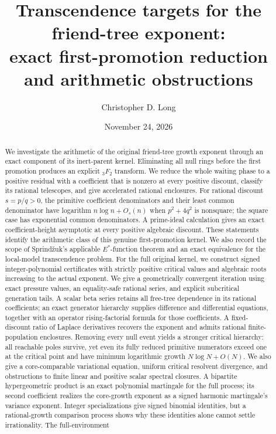 \documentclass[11pt]{article}
\title{Transcendence targets for the friend-tree exponent:\\
exact first-promotion reduction and arithmetic obstructions}
\author{Christopher D. Long}
\date{November 24, 2026}
\theoremstyle{remark}
\begin{document}
\maketitle
\begin{abstract}
We investigate the arithmetic of the original friend-tree growth exponent
through an exact component of its inert-parent kernel. Eliminating all
null rings before the first promotion produces an explicit ${}_3F_2$
transform. We reduce the whole waiting phase to a positive residual with
a coefficient that is nonzero at every positive discount, classify its
rational telescopes, and give accelerated rational enclosures. For rational
discount $s=p/q>0$, the primitive coefficient denominators and their least
common denominator have logarithm $n\log n+O_s(n)$ when $p^2+4q^2$ is
nonsquare; the square case has exponential common denominators. A
prime-ideal calculation gives an exact coefficient-height asymptotic at
every positive algebraic discount. These statements identify the arithmetic
class of this genuine first-promotion kernel. We also record the scope of
Sprind\v zuk's applicable $E^*$-function theorem and an exact equivalence
for the local-model transcendence problem. For the full original kernel,
we construct signed integer-polynomial certificates with strictly positive
critical values and algebraic roots increasing to the actual exponent.
We give a geometrically convergent iteration using exact pressure values,
an equality-safe rational series, and explicit subcritical generation
tails. A scalar beta series retains all free-tree dependence in its
rational coefficients; an exact generator hierarchy supplies difference
and differential equations, together with an operator rising-factorial
formula for those coefficients. A fixed-discount ratio of Laplace
derivatives recovers the exponent and admits rational finite-population
enclosures. Removing every null event yields a stronger critical hierarchy:
all reachable poles survive, yet even its fully reduced primitive
numerators exceed one at the critical point and have minimum logarithmic
growth $N\log N+O(N)$. We also give a core-comparable variational equation,
uniform critical resolvent divergence, and obstructions to finite linear
and positive scalar spectral closures. A bipartite hypergeometric product
is an exact polynomial martingale for the full process; its second
coefficient realizes the core-growth exponent as a signed harmonic
martingale's variance exponent. Integer specializations give signed
binomial identities, but a rational-growth comparison process shows why
these identities alone cannot settle irrationality. The full-environment

\end{abstract}
\end{document}

